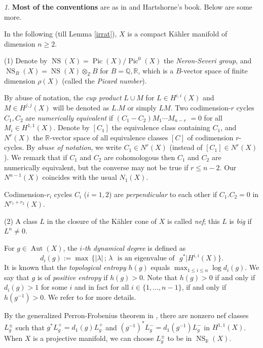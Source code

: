 \documentclass[11pt,a4paper,psamsfonts]{amsart}
\theoremstyle{plain}
\theoremstyle{definition}
\theoremstyle{remark}
\newtheorem{setup}[thm]{}
\begin{document}
\begin{setup}\label{conv}
{\bf Most of the conventions} are as in \cite{KM} and Hartshorne's book. Below are some more.

In the following (till Lemma \ref{irrat}), $X$ is a compact
K\"ahler manifold of dimension $n \ge 2$.

(1) Denote by ${\operatorname{NS}}(X) = {\operatorname{Pic}}(X)/{\operatorname{Pic}}^0(X)$ the
{\it Neron-Severi group}, and ${\operatorname{NS}}_{B}(X) = {\operatorname{NS}}(X) \otimes_{\mathbb{Z}} B$
for $B = {\mathbb{Q}}, {\mathbb{R}}$,
which is a $B$-vector space of finite dimension $\rho(X)$ (called the {\it Picard number}).

By abuse of notation, the {\it cup product} $L \cup M$ for
$L \in H^{i,i}(X)$ and $M \in H^{j,j}(X)$ will be denoted as
$L . M$ or simply $L M$.
Two codimension-$r$ cycles $C_1, C_2$ are {\it numerically equivalent} if
$(C_1 - C_2) M_1 \cdots M_{n-r}$ $= 0$ for all $M_i \in H^{1,1}(X)$.
Denote by $[C_1]$ the equivalence class containing $C_1$,
and $N^{r}(X)$ the ${\mathbb{R}}$-vector space of all equivalence classes $[C]$
of codimension $r$-cycles.
By {\it abuse of notation}, we write $C_1 \in N^r(X)$ (instead of $[C_1] \in N^r(X)$).
We remark that if $C_1$ and $C_2$ are cohomologous then
$C_1$ and $C_2$ are numerically equivalent, but the converse may not be true
if $r \le n-2$. Our $N^{n-1}(X)$ coincides with the usual $N_1(X)$.

Codimension-$r_i$ cycles $C_i$ ($i = 1, 2$) are {\it perpendicular} to each other
if $C_1 . C_2 = 0$ in $N^{r_1+r_2}(X)$.

(2) A class $L$ in the closure of the
K\"ahler cone of $X$ is called {\it nef}; this $L$ is {\it big} if $L^{n} \ne 0$.

For $g \in {\operatorname{Aut}}(X)$, the {\it $i$-th dynamical degree} is defined
as 
$$d_i(g) := \max \, \{|\lambda| \, ; \, \lambda \,\,\,\, \text{is
an eigenvalue of} \,\,\,\,  g^* | H^{i, i}(X) \} .$$
It is known that the {\it topological entropy} $h(g)$ equals $\max_{1 \le i \le n} \log d_i(g)$.
We say that $g$ is of {\it positive entropy} if $h(g) > 0$.
Note that $h(g) > 0$ if and only if $d_i(g) > 1$
for some $i$ and in fact for all $i \in \{1, \dots, n-1\}$, if and only if $h(g^{-1}) > 0$.
We refer to \cite{DS} for more details.

By the generalized Perron-Frobenius theorem in \cite{Bi}, there are nonzero nef classes
$L_g^{\pm}$ such that $g^*L_g^+ = d_1(g) L_g^+$ and $(g^{-1})^*L_g^- = d_1(g^{-1}) L_g^-$
in $H^{1,1}(X)$.
When $X$ is a projective manifold, we can choose $L_g^{\pm}$ to be in
${\operatorname{NS}}_{\mathbb{R}}(X)$.


\end{setup}
\end{document}
